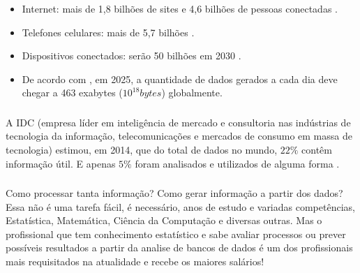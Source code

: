 \documentclass[12pt]{beamer}
\begin{document}
\begin{frame}{}
\frametitle{}
\begin{block}{}
\justifying
\begin{itemize}
\item Internet: mais de 1,8 bilhões de sites \cite{internetstats2} e 4,6 bilhões de pessoas conectadas \cite{statista}.\pause
\item Telefones celulares: mais de 5,7 bilhões \cite{datareportal}.\pause
\item Dispositivos conectados: serão 50 bilhões em 2030 \cite{statista}.\pause
\item De acordo com \citet{seedscientific}, em 2025, a quantidade de dados gerados a cada dia deve chegar a 463 exabytes ($10^{18} bytes$) globalmente.
\end{itemize}
\end{block}
\end{frame}

\begin{frame}{}
\frametitle{}
\begin{block}{}
\justifying
A IDC (empresa líder em inteligência de mercado e consultoria nas indústrias de tecnologia da informação, telecomunicações e mercados de consumo em massa de tecnologia) estimou, em 2014, que do total de dados no mundo, $22\%$ contêm informação útil. E apenas $5\%$ foram analisados e utilizados de alguma forma \cite{exame14}.
\end{block}
\end{frame}

\begin{frame}{}
\frametitle{}
\begin{block}{}
\justifying
Como processar tanta informação? Como gerar informação a partir dos dados? Essa não é uma tarefa fácil, é necessário, anos de estudo e variadas competências, Estatística, Matemática, Ciência da Computação e diversas outras. Mas o profissional que tem conhecimento estatístico e sabe avaliar processos ou prever possíveis resultados a partir da analise de bancos de dados é um dos profissionais mais requisitados na atualidade e recebe os maiores salários!
\end{block}
\end{frame}
\end{document}
